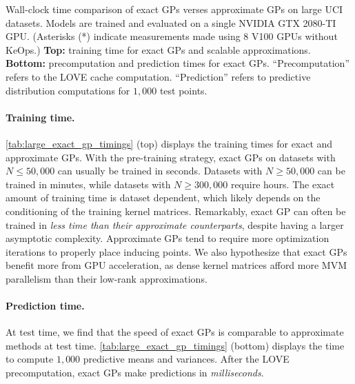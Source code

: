 \begin{table}[t!]
  \vspace{1em}
  \caption[Wall-clock time of exact GPs verse approximate GPs.]{
    Wall-clock time comparison of exact GPs verses approximate GPs on large UCI datasets.
    Models are trained and evaluated on a single NVIDIA GTX 2080-TI GPU.
    (Asterisks (*) indicate measurements made using 8 V100 GPUs without KeOps.)
    {\bf Top:} training time for exact GPs and scalable approximations.
    {\bf Bottom:} precomputation and prediction times for exact GPs.
    ``Precomputation'' refers to the LOVE cache computation.
    ``Prediction'' refers to predictive distribution computations for $1,\!000$ test points.
  }
  \label{tab:large_exact_gp_timings}
  \centering
  \vspace{1em}

  \resizebox{\textwidth}{!}{%
    
  }
  \vspace{1em}

  \resizebox{\textwidth}{!}{%
    
  }

  \vspace{2em}
\end{table}


\paragraph{Training time.}
\cref{tab:large_exact_gp_timings} (top) displays the training times for exact and approximate GPs.
With the pre-training strategy, exact GPs on datasets with $N \leq 50,\!000$ can usually be trained in seconds.
Datasets with $N \geq 50,\!000$ can be trained in minutes, while datasets with $N \geq 300,\!000$ require hours.
The exact amount of training time is dataset dependent, which likely depends on the conditioning of the training kernel matrices.
Remarkably, exact GP can often be trained in \emph{less time than their approximate counterparts}, despite having a larger asymptotic complexity.
Approximate GPs tend to require more optimization iterations to properly place inducing points.
We also hypothesize that exact GPs benefit more from GPU acceleration, as dense kernel matrices afford more MVM parallelism than their low-rank approximations.

\paragraph{Prediction time.}
At test time, we find that the speed of exact GPs is comparable to approximate methods at test time.
\cref{tab:large_exact_gp_timings} (bottom) displays the time to compute $1,\!000$ predictive means and variances.
After the LOVE precomputation, exact GPs make predictions in \emph{milliseconds}.

